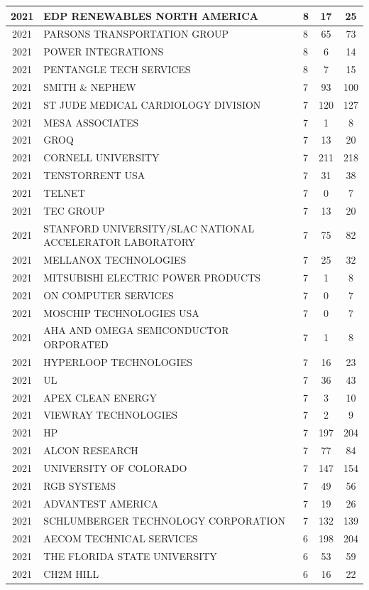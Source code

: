 \documentclass{article}%
\begin{document}
\begin{longtable}{c|p{20em}|p{5em}|c|c}
\hline%
2021&EDP RENEWABLES NORTH AMERICA&8&17&25\\%
\hline%
2021&PARSONS TRANSPORTATION GROUP&8&65&73\\%
\hline%
2021&POWER INTEGRATIONS&8&6&14\\%
\hline%
2021&PENTANGLE TECH SERVICES&8&7&15\\%
\hline%
2021&SMITH \& NEPHEW&7&93&100\\%
\hline%
2021&ST JUDE MEDICAL CARDIOLOGY DIVISION&7&120&127\\%
\hline%
2021&MESA ASSOCIATES&7&1&8\\%
\hline%
2021&GROQ&7&13&20\\%
\hline%
2021&CORNELL UNIVERSITY&7&211&218\\%
\hline%
2021&TENSTORRENT USA&7&31&38\\%
\hline%
2021&TELNET&7&0&7\\%
\hline%
2021&TEC GROUP&7&13&20\\%
\hline%
2021&STANFORD UNIVERSITY/SLAC NATIONAL ACCELERATOR LABORATORY&7&75&82\\%
\hline%
2021&MELLANOX TECHNOLOGIES&7&25&32\\%
\hline%
2021&MITSUBISHI ELECTRIC POWER PRODUCTS&7&1&8\\%
\hline%
2021&ON COMPUTER SERVICES&7&0&7\\%
\hline%
2021&MOSCHIP TECHNOLOGIES USA&7&0&7\\%
\hline%
2021&AHA AND OMEGA SEMICONDUCTOR ORPORATED&7&1&8\\%
\hline%
2021&HYPERLOOP TECHNOLOGIES&7&16&23\\%
\hline%
2021&UL&7&36&43\\%
\hline%
2021&APEX CLEAN ENERGY&7&3&10\\%
\hline%
2021&VIEWRAY TECHNOLOGIES&7&2&9\\%
\hline%
2021&HP&7&197&204\\%
\hline%
2021&ALCON RESEARCH&7&77&84\\%
\hline%
2021&UNIVERSITY OF COLORADO&7&147&154\\%
\hline%
2021&RGB SYSTEMS&7&49&56\\%
\hline%
2021&ADVANTEST AMERICA&7&19&26\\%
\hline%
2021&SCHLUMBERGER TECHNOLOGY CORPORATION&7&132&139\\%
\hline%
2021&AECOM TECHNICAL SERVICES&6&198&204\\%
\hline%
2021&THE FLORIDA STATE UNIVERSITY&6&53&59\\%
\hline%
2021&CH2M HILL&6&16&22\\%

\end{longtable}
\end{document}
